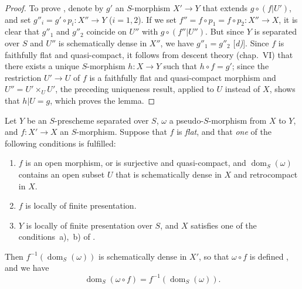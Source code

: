 \begin{proof}
To prove , denote by $g'$ an $S$-morphism $X'\to Y$ that extends $g\circ(f|U')$, and set $g''_i=g'\circ p_i:X''\to Y$ ($i=1,2$).
If we set $f''=f\circ p_1=f\circ p_2:X''\to X$, it is clear that $g''_1$ and $g''_2$ coincide on $U''$ with $g\circ(f''|U'')$.
But since $Y$ is separated over $S$ and $U''$ is schematically dense in $X''$, we have $g''_1=g''_2$ [\emph{d)}].
Since $f$ is faithfully flat and quasi-compact, it follows from descent theory (chap.~VI) that there exists a unique $S$-morphism $h:X\to Y$ such that $h\circ f=g'$; since the restriction $U'\to U$ of $f$ is a faithfully flat and quasi-compact morphism and $U''=U'\times_U U'$, the preceding uniqueness result, applied to $U$ instead of $X$, shows that $h|U=g$, which proves the lemma.
\end{proof}

\begin{proposition}[20.3.11]
\label{IV.20.3.11}
Let $Y$ be an $S$-prescheme separated over $S$, $\omega$ a pseudo-$S$-morphism from $X$ to $Y$, and $f:X'\to X$ an $S$-morphism.
Suppose that $f$ is \emph{flat}, and that \emph{one} of the following conditions is fulfilled:
\begin{enumerate}[label=\emph{(\roman*)}]
  \item $f$ is an open morphism, or is surjective and quasi-compact, and $\operatorname{dom}_S(\omega)$ contains an open subset $U$ that is schematically dense in $X$ and retrocompact in $X$.
  \item $f$ is locally of finite presentation.
  \item $Y$ is locally of finite presentation over $S$, and $X$ satisfies one of the conditions~\textup{a)},~\textup{b)} of .
\end{enumerate}
Then $f^{-1}(\operatorname{dom}_S(\omega))$ is schematically dense in $X'$, so that $\omega\circ f$ is defined , and we have
\[
\label{IV.20.3.11.1}
  \operatorname{dom}_S(\omega\circ f)=f^{-1}(\operatorname{dom}_S(\omega)).
  \tag{20.3.11.1}
\]
\end{proposition}

